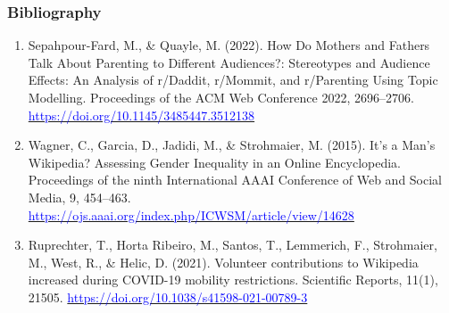 \documentclass[aspectratio=169]{beamer}
\begin{document}
\begin{frame}
    \frametitle{Bibliography}
    \tiny
    \begin{enumerate}
        \item Sepahpour-Fard, M., \& Quayle, M. (2022). How Do Mothers and Fathers Talk About Parenting to Different Audiences?: Stereotypes and Audience Effects: An Analysis of r/Daddit, r/Mommit, and r/Parenting Using Topic Modelling. Proceedings of the ACM Web Conference 2022, 2696–2706. \href{https://doi.org/10.1145/3485447.3512138}{\textcolor{blue}{https://doi.org/10.1145/3485447.3512138}}
        \item Wagner, C., Garcia, D., Jadidi, M., \& Strohmaier, M. (2015). It’s a Man’s Wikipedia? Assessing Gender Inequality in an Online Encyclopedia. Proceedings of the ninth International AAAI Conference of Web and Social Media, 9, 454–463. \href{https://ojs.aaai.org/index.php/ICWSM/article/view/14628}{\textcolor{blue}{https://ojs.aaai.org/index.php/ICWSM/article/view/14628}}
        \item Ruprechter, T., Horta Ribeiro, M., Santos, T., Lemmerich, F., Strohmaier, M., West, R., \& Helic, D. (2021). Volunteer contributions to Wikipedia increased during COVID-19 mobility restrictions. Scientific Reports, 11(1), 21505. \href{https://doi.org/10.1038/s41598-021-00789-3}{\textcolor{blue}{https://doi.org/10.1038/s41598-021-00789-3}}
    \end{enumerate}
    
\end{frame}
\end{document}
